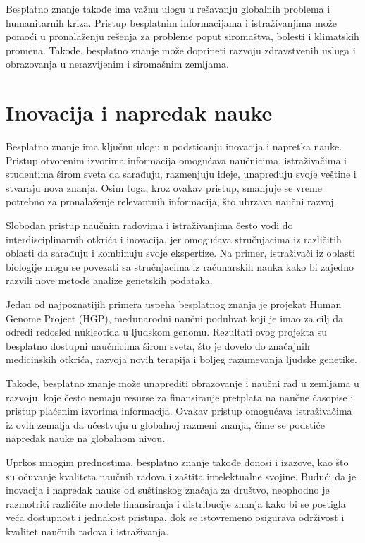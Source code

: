 \documentclass[a4paper]{article}
\begin{document}
{\cite{prva}

Besplatno znanje takođe ima važnu ulogu u rešavanju globalnih problema i humanitarnih kriza. Pristup besplatnim informacijama i istraživanjima može pomoći u pronalaženju rešenja za probleme poput siromaštva, bolesti i klimatskih promena. Takođe, besplatno znanje može doprineti razvoju zdravstvenih usluga i obrazovanja u nerazvijenim i siromašnim zemljama.

\cite{sesta}


\setlength{\parskip}{1em}

\section{Inovacija i napredak nauke}
\label{sec:Inovacija i napredak nauke}


Besplatno znanje ima ključnu ulogu u podsticanju inovacija i napretka nauke. Pristup otvorenim izvorima informacija omogućava naučnicima, istraživačima i studentima širom sveta da sarađuju, razmenjuju ideje, unapređuju svoje veštine i stvaraju nova znanja. Osim toga, kroz ovakav pristup, smanjuje se vreme potrebno za pronalaženje relevantnih informacija, što ubrzava naučni razvoj.

Slobodan pristup naučnim radovima i istraživanjima često vodi do interdisciplinarnih otkrića i inovacija, jer omogućava stručnjacima iz različitih oblasti da sarađuju i kombinuju svoje ekspertize. Na primer, istraživači iz oblasti biologije mogu se povezati sa stručnjacima iz računarskih nauka kako bi zajedno razvili nove metode analize genetskih podataka.

Jedan od najpoznatijih primera uspeha besplatnog znanja je projekat Human Genome Project (HGP), međunarodni naučni poduhvat koji je imao za cilj da odredi redosled nukleotida u  ljudskom genomu. Rezultati ovog projekta su besplatno dostupni naučnicima širom sveta, što je dovelo do značajnih medicinskih otkrića, razvoja novih terapija i boljeg razumevanja ljudske genetike.

Takođe, besplatno znanje može unaprediti obrazovanje i naučni rad u zemljama u razvoju, koje često nemaju resurse za finansiranje pretplata na naučne časopise i pristup plaćenim izvorima informacija. Ovakav pristup omogućava istraživačima iz ovih zemalja da učestvuju u globalnoj razmeni znanja, čime se podstiče napredak nauke na globalnom nivou.

Uprkos mnogim prednostima, besplatno znanje takođe donosi i izazove, kao što su očuvanje kvaliteta naučnih radova i zaštita intelektualne svojine. Budući da je inovacija i napredak nauke od suštinskog značaja za društvo, neophodno je razmotriti različite modele finansiranja i distribucije znanja kako bi se postigla veća dostupnost i jednakost pristupa, dok se istovremeno osigurava održivost i kvalitet naučnih radova i istraživanja.


}
\end{document}
